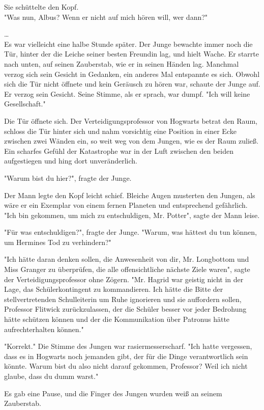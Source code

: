 {Sie schüttelte den Kopf.\\ "Was nun, Albus? Wenn er nicht auf mich hören will, wer dann?"

…\\ Es war vielleicht eine halbe Stunde später. Der Junge bewachte immer noch die Tür, hinter der die Leiche seiner besten Freundin lag, und hielt Wache. Er starrte nach unten, auf seinen Zauberstab, wie er in seinen Händen lag. Manchmal verzog sich sein Gesicht in Gedanken, ein anderes Mal entspannte es sich. Obwohl sich die Tür nicht öffnete und kein Geräusch zu hören war, schaute der Junge auf. Er verzog sein Gesicht. Seine Stimme, als er sprach, war dumpf. "Ich will keine Gesellschaft."

Die Tür öffnete sich. Der Verteidigungsprofessor von Hogwarts betrat den Raum, schloss die Tür hinter sich und nahm vorsichtig eine Position in einer Ecke zwischen zwei Wänden ein, so weit weg von dem Jungen, wie es der Raum zuließ. Ein scharfes Gefühl der Katastrophe war in der Luft zwischen den beiden aufgestiegen und hing dort unveränderlich.

"Warum bist du hier?", fragte der Junge.

Der Mann legte den Kopf leicht schief. Bleiche Augen musterten den Jungen, als wäre er ein Exemplar von einem fernen Planeten und entsprechend gefährlich.\\ "Ich bin gekommen, um mich zu entschuldigen, Mr. Potter", sagte der Mann leise.

"Für was entschuldigen?", fragte der Junge. "Warum, was hättest du tun können, um Hermines Tod zu verhindern?"

"Ich hätte daran denken sollen, die Anwesenheit von dir, Mr. Longbottom und Miss Granger zu überprüfen, die alle offensichtliche nächste Ziele waren", sagte der Verteidigungsprofessor ohne Zögern. "Mr. Hagrid war geistig nicht in der Lage, das Schülerkontingent zu kommandieren. Ich hätte die Bitte der stellvertretenden Schulleiterin um Ruhe ignorieren und sie auffordern sollen, Professor Flitwick zurückzulassen, der die Schüler besser vor jeder Bedrohung hätte schützen können und der die Kommunikation über Patronus hätte aufrechterhalten können."

"Korrekt." Die Stimme des Jungen war rasiermesserscharf. "Ich hatte vergessen, dass es in Hogwarts noch jemanden gibt, der für die Dinge verantwortlich sein könnte. Warum bist du also nicht darauf gekommen, Professor? Weil ich nicht glaube, dass du dumm warst."

Es gab eine Pause, und die Finger des Jungen wurden weiß an seinem Zauberstab.

}
